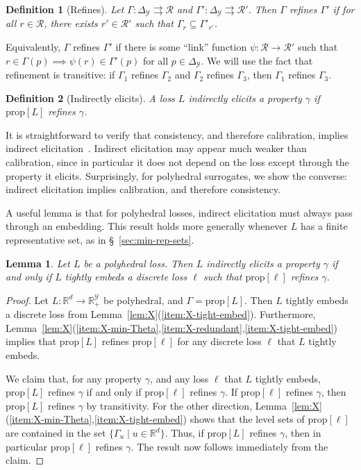 \documentclass[11pt]{article}
\newcommand{\reals}{\mathbb{R}}
\newcommand{\prop}[1]{\mathrm{prop}[#1]}
\newcommand{\simplex}{\Delta_\Y}
\newcommand{\R}{\mathcal{R}}
\newcommand{\Y}{\mathcal{Y}}
\newcommand{\toto}{\rightrightarrows}
\newtheorem{lemma}{Lemma}
\newtheorem{definition}{Definition}
\begin{document}
\begin{definition}[Refines]
	Let $\Gamma:\simplex \toto \R$ and $\Gamma':\simplex\toto \R'$.
	Then $\Gamma$ \emph{refines} $\Gamma'$ if for all $r \in \R$, there exists $r' \in \R'$ such that $\Gamma_{r} \subseteq \Gamma'_{r'}$.
\end{definition}
Equivalently, $\Gamma$ refines $\Gamma'$ if there is some ``link'' function $\psi:\R\to\R'$ such that $r\in\Gamma(p) \implies \psi(r) \in \Gamma'(p)$ for all $p\in\simplex$.
We will use the fact that refinement is transitive: if $\Gamma_1$ refines $\Gamma_2$ and $\Gamma_2$ refines $\Gamma_3$, then $\Gamma_1$ refines $\Gamma_3$.

\begin{definition}[Indirectly elicits]
  A loss $L$ \emph{indirectly elicits} a property $\gamma$ if $\prop L$ refines $\gamma$.
\end{definition}

It is straightforward to verify that consistency, and therefore calibration, implies indirect elicitation~\citep{finocchiaro2021unifying,agarwal2015consistent,steinwart2008support}.
Indirect elicitation may appear much weaker than calibration, since in particular it does not depend on the loss except through the property it elicits.
Surprisingly, for polyhedral surrogates, we show the converse: indirect elicitation implies calibration, and therefore consistency.

A useful lemma is that for polyhedral losses, indirect elicitation must always pass through an embedding.
This result holds more generally whenever $L$ has a finite representative set, as in \S~\ref{sec:min-rep-sets}.
\begin{lemma}\label{lem:ie-iff-embeds-refinement}
  Let $L$ be a polyhedral loss.
  Then $L$ indirectly elicits a property $\gamma$ if and only if $L$ tightly embeds a discrete loss $\ell$ such that $\prop \ell$ refines $\gamma$.
\end{lemma}
\begin{proof}
  Let $L:\reals^d\to\reals^\Y_+$ be polyhedral, and $\Gamma = \prop L$.
  Then $L$ tightly embeds a discrete loss from Lemma~\ref{lem:X}(\ref{item:X-tight-embed}).
  Furthermore, Lemma~\ref{lem:X}(\ref{item:X-min-Theta},\ref{item:X-redundant},\ref{item:X-tight-embed}) implies that $\prop L$ refines $\prop \ell$ for any discrete loss $\ell$ that $L$ tightly embeds.

  We claim that, for any property $\gamma$, and any loss $\ell$ that $L$ tightly embeds, $\prop L$ refines $\gamma$ if and only if $\prop \ell$ refines $\gamma$.
  If $\prop \ell$ refines $\gamma$, then $\prop L$ refines $\gamma$ by transitivity.
  For the other direction, Lemma~\ref{lem:X}(\ref{item:X-min-Theta},\ref{item:X-tight-embed}) shows that the level sets of $\prop \ell$ are contained in the set $\{\Gamma_u \mid u\in\reals^d\}$.
  Thus, if $\prop L$ refines $\gamma$, then in particular $\prop \ell$ refines $\gamma$.
  The result now follows immediately from the claim.
\end{proof}
\end{document}
